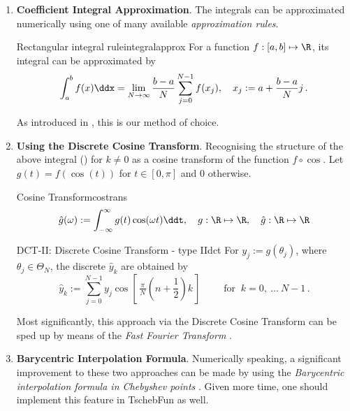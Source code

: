 \documentclass[12pt, a4paper]{article}
\newcommand{\tschebfun}{\textcolor{themecolor3}{TschebFun}\xspace}
\begin{document}
  \begin{enumerate}
    \item \textbf{Coefficient Integral Approximation}.
          The integrals can be approximated numerically using one of many available \textit{approximation rules}.
          \begin{theorem}{Rectangular integral rule}{integralapprox}
            For a function $f: [a, b] \mapsto \R$, its integral can be approximated by
            $$\int_a^b f(x) \ddx = \lim_{N \rightarrow \infty} \frac{b-a}{N} \sum_{j=0}^{N-1} f(x_j), \quad x_j := a + \frac{b-a}{N} j \,.$$
          \end{theorem}
          As introduced in \cite{bonthuis-cp}, this is our method of choice.

    \item \textbf{Using the Discrete Cosine Transform}.
          Recognising the structure of the above integral () for $k \neq 0$ as a cosine transform of the function $f \circ \cos$. Let $g(t) = f(\cos(t))$ for $t \in [0, \pi]$ and $0$ otherwise.

          \begin{definition}{Cosine Transform}{costrans}
            $$\hat{g}(\omega) := \int_{-\infty}^{\infty} g(t) \cos(\omega t) \ddt, \quad g: \R \mapsto \R, \quad \hat{g}: \R \mapsto \R$$
          \end{definition}
          \vspace*{-0.5cm}
          \begin{definition}{DCT-II: Discrete Cosine Transform - type II}{dct}
            For $y_j := g(\theta_j)$, where $\theta_j \in \Theta_N$, the discrete $\hat{y}_k$ are obtained by
            $$\hat{y}_k := \sum_{j=0}^{N-1}y_{j}\cos \left[\,{\tfrac {\,\pi \,}{N}}\left(n+{\frac {1}{2}}\right)k\,\right]\qquad {\text{ for }}~k=0,\ \dots \ N-1\,.$$
          \end{definition}

          Most significantly, this approach via the Discrete Cosine Transform can be sped up by means of the \emph{Fast Fourier Transform} \parencite{cooley-tukey-fft}.

    \item \textbf{Barycentric Interpolation Formula}.
          Numerically speaking, a significant improvement to these two approaches can be made by using the \emph{Barycentric interpolation formula in Chebyshev points} \parencite{atap}. Given more time, one should implement this feature in \tschebfun as well.
  \end{enumerate}
\end{document}
